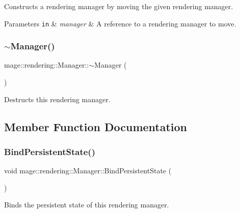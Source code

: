 Constructs a rendering manager by moving the given rendering manager.


\begin{DoxyParams}[1]{Parameters}
\mbox{\tt in}  & {\em manager} & A reference to a rendering manager to move. \\
\hline
\end{DoxyParams}
\hypertarget{classmage_1_1rendering_1_1_manager_a9b43ab8313e441faadb60863759bbc46}{}\label{classmage_1_1rendering_1_1_manager_a9b43ab8313e441faadb60863759bbc46} 
\subsubsection{\texorpdfstring{$\sim$\+Manager()}{~Manager()}}
{\footnotesize\ttfamily mage\+::rendering\+::\+Manager\+::$\sim$\+Manager (\begin{DoxyParamCaption}{ }\end{DoxyParamCaption})\hspace{0.3cm}{\ttfamily [default]}}

Destructs this rendering manager. 

\subsection{Member Function Documentation}
\hypertarget{classmage_1_1rendering_1_1_manager_ac46b7739c7005b5a7248642ffc8299d7}{}\label{classmage_1_1rendering_1_1_manager_ac46b7739c7005b5a7248642ffc8299d7} 
\subsubsection{\texorpdfstring{Bind\+Persistent\+State()}{BindPersistentState()}}
{\footnotesize\ttfamily void mage\+::rendering\+::\+Manager\+::\+Bind\+Persistent\+State (\begin{DoxyParamCaption}{ }\end{DoxyParamCaption})}

Binds the persistent state of this rendering manager.


